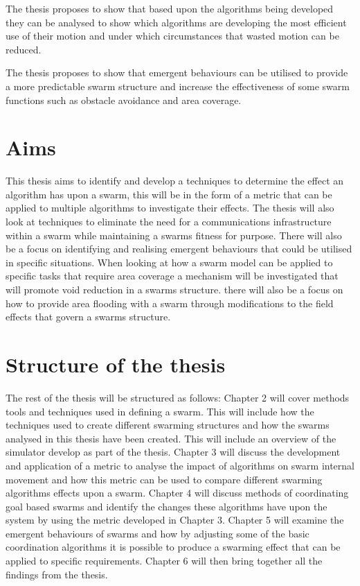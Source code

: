 The thesis proposes to show that based upon the algorithms being developed they can be analysed to show which algorithms are developing the most efficient use of their motion and under which circumstances that wasted motion can be reduced.

The thesis proposes to show that emergent behaviours can be utilised to provide a more predictable swarm structure and increase the effectiveness of some swarm functions such as obstacle avoidance and area coverage.
 
\section{Aims}
This thesis aims to identify and develop a techniques to determine the effect an algorithm has upon a swarm, this will be in the form of a metric that can be applied to multiple algorithms to investigate their effects. The thesis will also look at techniques to eliminate the need for a communications infrastructure within a swarm while maintaining a swarms fitness for purpose. There will also be a focus on identifying and realising emergent behaviours that could be utilised in specific situations. When looking at how a swarm model can be applied to specific tasks that require area coverage a mechanism will be investigated that will promote void reduction in a swarms structure. there will also be a focus on how to provide area flooding with a swarm through modifications to the field effects that govern a swarms structure.

\section{Structure of the thesis}
The rest of the thesis will be structured as follows: Chapter 2 will cover methods tools and techniques used in defining a swarm. This will include how the techniques used to create different swarming structures and how the swarms analysed in this thesis have been created. This will include an overview of the simulator develop as part of the thesis. Chapter 3 will discuss the development and application of a metric to analyse the impact of algorithms on swarm internal movement and how this metric can be used to compare different swarming algorithms effects upon a swarm. Chapter 4 will discuss methods of coordinating goal based swarms and identify the changes these algorithms have upon the system by using the metric developed in Chapter 3. Chapter 5 will examine the emergent behaviours of swarms and how by adjusting some of the basic coordination algorithms it is possible to produce a swarming effect that can be applied to specific requirements. Chapter 6 will then bring together all the findings from the thesis.